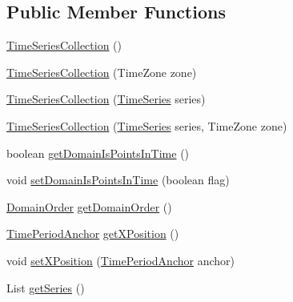 \subsection*{Public Member Functions}
\begin{DoxyCompactItemize}
\item 
\mbox{\hyperlink{classorg_1_1jfree_1_1data_1_1time_1_1_time_series_collection_a1c887fd4b91a94f77d9989f80683fcf7}{Time\+Series\+Collection}} ()
\item 
\mbox{\hyperlink{classorg_1_1jfree_1_1data_1_1time_1_1_time_series_collection_a17e200acf18cb6f7d0d86be467cd33cd}{Time\+Series\+Collection}} (Time\+Zone zone)
\item 
\mbox{\hyperlink{classorg_1_1jfree_1_1data_1_1time_1_1_time_series_collection_ad48cb520d2efa358fcd9ea0ecc239bc2}{Time\+Series\+Collection}} (\mbox{\hyperlink{classorg_1_1jfree_1_1data_1_1time_1_1_time_series}{Time\+Series}} series)
\item 
\mbox{\hyperlink{classorg_1_1jfree_1_1data_1_1time_1_1_time_series_collection_a303aaca786004a635b2c70f1d3fe012c}{Time\+Series\+Collection}} (\mbox{\hyperlink{classorg_1_1jfree_1_1data_1_1time_1_1_time_series}{Time\+Series}} series, Time\+Zone zone)
\item 
boolean \mbox{\hyperlink{classorg_1_1jfree_1_1data_1_1time_1_1_time_series_collection_a124a5c005c8620703bfc2666fd2c83ea}{get\+Domain\+Is\+Points\+In\+Time}} ()
\item 
void \mbox{\hyperlink{classorg_1_1jfree_1_1data_1_1time_1_1_time_series_collection_a1020aafcb0076fa33af584ff3d51f295}{set\+Domain\+Is\+Points\+In\+Time}} (boolean flag)
\item 
\mbox{\hyperlink{classorg_1_1jfree_1_1data_1_1_domain_order}{Domain\+Order}} \mbox{\hyperlink{classorg_1_1jfree_1_1data_1_1time_1_1_time_series_collection_add31c4755cd5492cdc1a6e3055530467}{get\+Domain\+Order}} ()
\item 
\mbox{\hyperlink{classorg_1_1jfree_1_1data_1_1time_1_1_time_period_anchor}{Time\+Period\+Anchor}} \mbox{\hyperlink{classorg_1_1jfree_1_1data_1_1time_1_1_time_series_collection_a4c3b131735a639e58c104975adae7425}{get\+X\+Position}} ()
\item 
void \mbox{\hyperlink{classorg_1_1jfree_1_1data_1_1time_1_1_time_series_collection_a7a055bdd005738c08405ceb646df0113}{set\+X\+Position}} (\mbox{\hyperlink{classorg_1_1jfree_1_1data_1_1time_1_1_time_period_anchor}{Time\+Period\+Anchor}} anchor)
\item 
List \mbox{\hyperlink{classorg_1_1jfree_1_1data_1_1time_1_1_time_series_collection_a4bf43603e0e8d765edd7f81a815b21db}{get\+Series}} ()

\end{DoxyCompactItemize}
